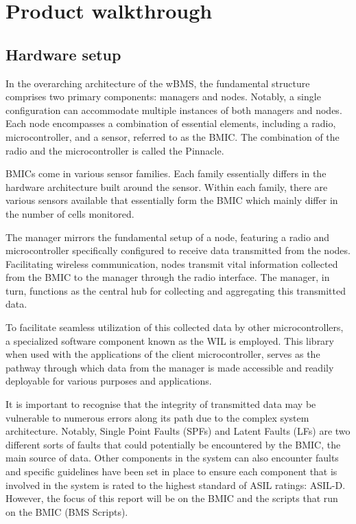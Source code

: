 \chapter{Product walkthrough} %

\label{ch:walkthrough}


\section{Hardware setup}

In the overarching architecture of the wBMS, the fundamental structure comprises two primary components: managers and nodes. Notably, a single configuration can accommodate multiple instances of both managers and nodes. Each node encompasses a combination of essential elements, including a radio, microcontroller, and a sensor, referred to as the BMIC. The combination of the radio and the microcontroller is called the Pinnacle.

BMICs come in various sensor families. Each family essentially differs in the hardware architecture built around the sensor. Within each family, there are various sensors available that essentially form the BMIC which mainly differ in the number of cells monitored.

The manager mirrors the fundamental setup of a node, featuring a radio and microcontroller specifically configured to receive data transmitted from the nodes. Facilitating wireless communication, nodes transmit vital information collected from the BMIC to the manager through the radio interface. The manager, in turn, functions as the central hub for collecting and aggregating this transmitted data.

To facilitate seamless utilization of this collected data by other microcontrollers, a specialized software component known as the WIL is employed. This library when used with the applications of the client microcontroller, serves as the pathway through which data from the manager is made accessible and readily deployable for various purposes and applications.

It is important to recognise that the integrity of transmitted data may be vulnerable to numerous errors along its path due to the complex system architecture. Notably, Single Point Faults (SPFs) and Latent Faults (LFs) are two different sorts of faults that could potentially be encountered by the BMIC, the main source of data. Other components in the system can also encounter faults and specific guidelines have been set in place to ensure each component that is involved in the system is rated to the highest standard of ASIL ratings: ASIL-D. However, the focus of this report will be on the BMIC and the scripts that run on the BMIC (BMS Scripts).

